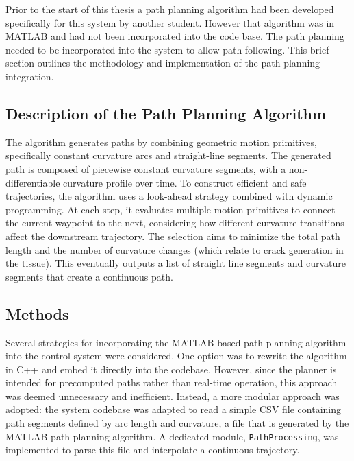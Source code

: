 Prior to the start of this thesis a path planning algorithm had been developed specifically for this system by another student. However that algorithm was in MATLAB and had not been incorporated into the code base. The path planning needed to be incorporated into the system to allow path following. This brief section outlines the methodology and implementation of the path planning integration.

\subsection{Description of the Path Planning Algorithm}
The algorithm generates paths by combining geometric motion primitives, specifically constant curvature arcs and straight-line segments. The generated path is composed of piecewise constant curvature segments, with a non-differentiable curvature profile over time. To construct efficient and safe trajectories, the algorithm uses a look-ahead strategy combined with dynamic programming. At each step, it evaluates multiple motion primitives to connect the current waypoint to the next, considering how different curvature transitions affect the downstream trajectory. The selection aims to minimize the total path length and the number of curvature changes (which relate to crack generation in the tissue). This eventually outputs a list of straight line segments and curvature segments that create a continuous path. 

\subsection{Methods}
Several strategies for incorporating the MATLAB-based path planning algorithm into the control system were considered. One option was to rewrite the algorithm in C++ and embed it directly into the codebase. However, since the planner is intended for precomputed paths rather than real-time operation, this approach was deemed unnecessary and inefficient.
\newline \newline
Instead, a more modular approach was adopted: the system codebase was adapted to read a simple CSV file containing path segments defined by arc length and curvature, a file that is generated by the MATLAB path planning algorithm. A dedicated module, \texttt{PathProcessing}, was implemented to parse this file and interpolate a continuous trajectory. 

